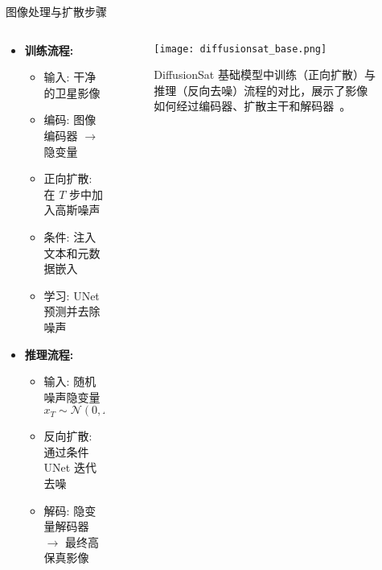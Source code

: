 \begin{refsection}
  \begin{frame}{图像处理与扩散步骤}
    \begin{columns}[t]
      \begin{column}{0.5\textwidth}
        \small
        \begin{itemize}
          \item \textbf{训练流程:}
          \begin{itemize}
            \item 输入: 干净的卫星影像
            \item 编码: 图像编码器 $\rightarrow$ 隐变量
            \item 正向扩散: 在 \(T\) 步中加入高斯噪声
            \item 条件: 注入文本和元数据嵌入
            \item 学习: UNet 预测并去除噪声
          \end{itemize}
          \item \textbf{推理流程:}
          \begin{itemize}
            \item 输入: 随机噪声隐变量 \(x_T\!\sim\!\mathcal{N}(0,I)\)
            \item 反向扩散: 通过条件 UNet 迭代去噪
            \item 解码: 隐变量解码器 $\rightarrow$ 最终高保真影像
          \end{itemize}
        \end{itemize}
      \end{column}
      \begin{column}{0.5\textwidth}
        \begin{figure}
          \centering
          \texttt{[image: diffusionsat\_base.png]}
          \caption{\scriptsize DiffusionSat 基础模型中训练（正向扩散）与推理（反向去噪）流程的对比，展示了影像如何经过编码器、扩散主干和解码器~\parencite{diffusionset2024}。}
        \end{figure}
      \end{column}
    \end{columns}
    \bottomleftrefs
  \end{frame}
\end{refsection}

